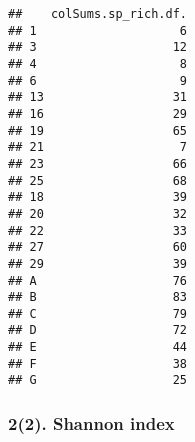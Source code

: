 \documentclass[
]{article}
\begin{document}
\begin{verbatim}
##    colSums.sp_rich.df.
## 1                    6
## 3                   12
## 4                    8
## 6                    9
## 13                  31
## 16                  29
## 19                  65
## 21                   7
## 23                  66
## 25                  68
## 18                  39
## 20                  32
## 22                  33
## 27                  60
## 29                  39
## A                   76
## B                   83
## C                   79
## D                   72
## E                   44
## F                   38
## G                   25
\end{verbatim}

\subsubsection{2(2). Shannon index}\label{shannon-index}
\end{document}
